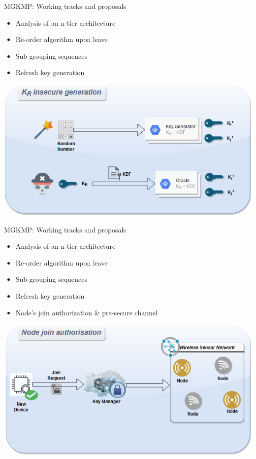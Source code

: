 \documentclass{beamer}
\begin{document}
\begin{frame}{MGKMP: Working tracks and proposals}
	\begin{itemize}
		\item Analysis of an n-tier architecture
		\item Re-order algorithm upon leave
		\item Sub-grouping sequences
		\item Refresh key generation
	\end{itemize}
	\vfill
	\centering
	\includegraphics[scale=0.37]{figures/mgkmp/random.png}
\end{frame}

\begin{frame}{MGKMP: Working tracks and proposals}
	\begin{itemize}
		\item Analysis of an n-tier architecture
		\item Re-order algorithm upon leave
		\item Sub-grouping sequences
		\item Refresh key generation
		\item Node’s join authorization \& pre-secure channel
	\end{itemize}
	\vfill
	\centering
	\includegraphics[scale=0.37]{figures/mgkmp/join_auth.png}
\end{frame}
\end{document}

